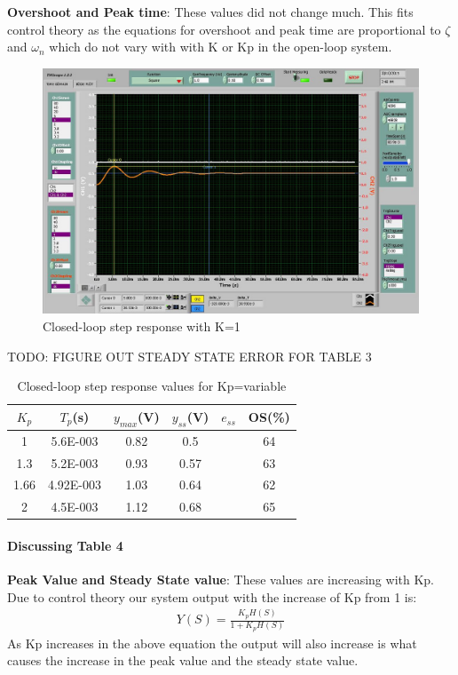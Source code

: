 \documentclass{article}
\begin{document}
\textbf{Overshoot and Peak time}: These values did not change much. This fits control theory as the equations for overshoot and peak time are proportional to $\zeta$ and $\omega_n$ which do not vary with with K or Kp in the open-loop system.


\begin{figure}[ht]
\centering
\includegraphics[width=7in]{4_2b.jpg}
\caption{Closed-loop step response with K=1}
\end{figure}
TODO: FIGURE OUT STEADY STATE ERROR FOR TABLE 3
\begin{table}[ht]
\centering
    \begin{tabular}{|c|c|c|c|c|c|}
        \hline
        $K_p$ & $T_p$(s) & $y_{max}$(V) & $y_{ss}$(V) & $e_{ss}$ & OS(\%)\\
        \hline
        1 & 5.6E-003 & 0.82 & 0.5 & & 64\\
        \hline
        1.3 & 5.2E-003 & 0.93 & 0.57 & & 63\\
        \hline
        1.66 & 4.92E-003 & 1.03 & 0.64 & & 62\\
        \hline
        2 & 4.5E-003 & 1.12 & 0.68 & & 65\\
        \hline
    \end{tabular}
    \caption{Closed-loop step response values for Kp=variable}
\end{table}

\paragraph{Discussing Table 4}

\textbf{Peak Value and Steady State value}: These values are increasing with Kp. Due to control theory our system output with the increase of Kp from 1 is:
\begin{align*}
      Y(S) = \frac{K_pH(S)}{1 + K_pH(S)}
  \end{align*}
As Kp increases in the above equation the output will also increase is what causes the increase in the peak value and the steady state value.
\end{document}
